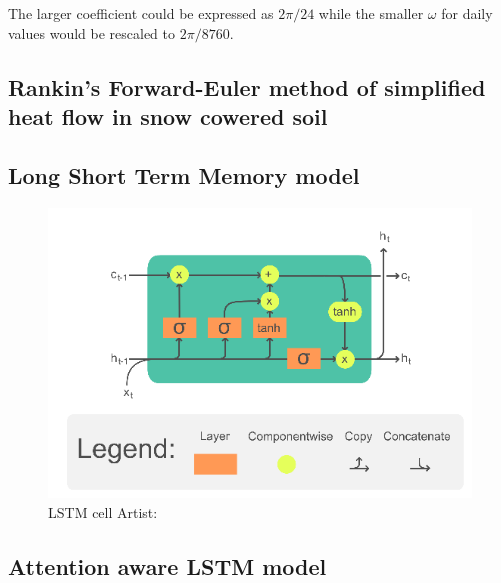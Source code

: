 The larger coefficient could be expressed as $2\pi/24$ while the smaller $\omega$ for daily values would be rescaled to $2\pi/8760$.

\subsection[Rankin algorithm]{Rankin's Forward-Euler method of simplified heat flow in snow cowered soil}\cite{rankinen_simple_2004}


\subsection{Long Short Term Memory model}

\begin{figure}[ht]
	\centering
	\includegraphics[width=0.7\linewidth]{figures/LSTM_Cell}
	\caption{LSTM cell  Artist: \textcite{chevalier_english_2018}}
	\label{fig:lstmcell}
\end{figure}

\subsection[ILSTM]{Attention aware LSTM model}

